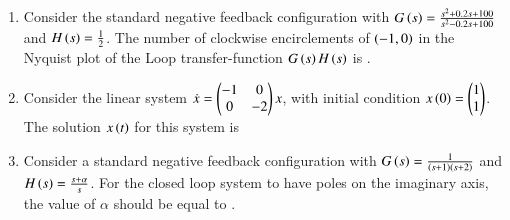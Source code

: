 \documentclass[journal,12pt,onecolumn]{IEEEtran}
\theoremstyle{remark}
\begin{document}
\begin{enumerate}
    \hfill{}
    \begin{enumerate}
    \end{enumerate}
    
    \item Consider the standard negative feedback configuration with $G\left(s\right) =\frac{s^2+0.2s+100}{s^2-0.2s+100}$ and $H\left(s\right) =\frac{1}{2}$. The number of clockwise encirclements of $\left(-1,0\right)$ in the Nyquist plot of the Loop transfer-function $G\left(s\right)H\left(s\right)$ is \underline{\hspace{2cm}}.
    
    \hfill{}

    \item Consider the linear system $\dot{x} = \begin{pmatrix}-1 & 0\\0 & -2\end{pmatrix} x$, with initial condition $x\left(0\right) = \begin{pmatrix}1\\1\end{pmatrix}$. The solution $x\left(t\right)$ for this system is
    
    \hfill{}
    \begin{enumerate}
    \end{enumerate}

    \item Consider a standard negative feedback configuration with $G\left(s\right) =\frac{1}{\left(s+1\right)\left(s+2\right)}$ and $H\left(s\right) =\frac{s+\alpha}{s}$. For the closed loop system to have poles on the imaginary axis, the value of $\alpha$ should be equal to  \underline{\hspace{2cm}}.
    

\end{enumerate}
\end{document}
